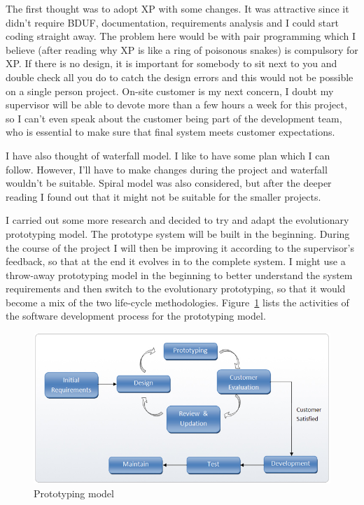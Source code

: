 \documentclass[]{report}
\begin{document}
The first thought was to adopt XP with some changes. It was attractive since it didn't require BDUF, documentation, requirements analysis and I could start coding straight away. The problem here would be with pair programming which I believe (after reading why XP is like a ring of poisonous snakes) is compulsory for XP. If there is no design, it is important for somebody to sit next to you and double check all you do to catch the design errors and this would not be possible on a single person project. On-site customer is my next concern, I doubt my supervisor will be able to devote more than a few hours a week for this project, so I can't even speak about the customer being part of the development team, who is essential to make sure that final system meets customer expectations.

I have also thought of waterfall model. I like to have some plan which I can follow. However, I'll have to make changes during the project and waterfall wouldn't be suitable. Spiral model was also considered, but after the deeper reading I found out that it might not be suitable for the smaller projects.

I carried out some more research and decided to try and adapt the evolutionary prototyping model. The prototype system will be built in the beginning. During the course of the project I will then be improving it according to the supervisor's feedback, so that at the end it evolves in to the complete system. I might use a throw-away prototyping model in the beginning to better understand the system requirements and then switch to the evolutionary prototyping, so that it would become a mix of the two life-cycle methodologies. Figure~\ref{fig:Evolutionary_Prototyping} lists the activities of the software development process for the prototyping model. 

\begin{figure}[H]
\centering
\centerline{\includegraphics[scale=0.55]{./prototype_methodology}}
\caption{Prototyping model \cite{Evolutionary_Prototyping}}
\label{fig:Evolutionary_Prototyping}
\end{figure}
\end{document}
